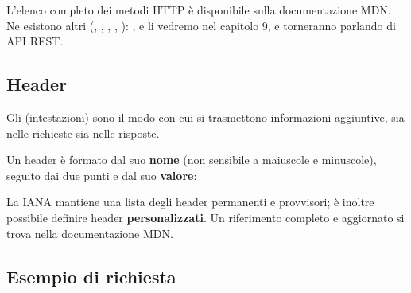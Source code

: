 L'elenco completo dei metodi HTTP è disponibile sulla documentazione MDN. Ne
esistono altri (, , , ,
): ,  e  li vedremo nel
capitolo 9, e torneranno parlando di API REST.


\subsection{Header}

Gli  (intestazioni) sono il modo con cui si trasmettono
informazioni aggiuntive, sia nelle richieste sia nelle risposte.

Un header è formato dal suo \textbf{nome} (non sensibile a maiuscole e
minuscole), seguito dai due punti e dal suo \textbf{valore}:

\begin{center}
\end{center}

La IANA mantiene una lista degli header permanenti e provvisori; è inoltre
possibile definire header \textbf{personalizzati}. Un riferimento completo e
aggiornato si trova nella documentazione MDN.

\subsection{Esempio di richiesta}


